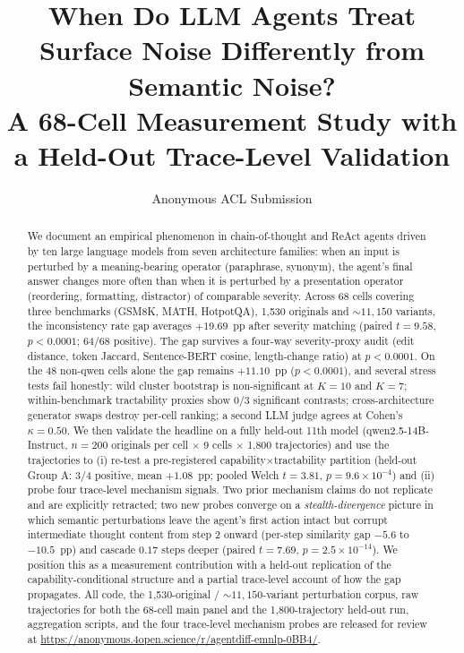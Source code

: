 \documentclass[11pt]{article}
\title{When Do LLM Agents Treat Surface Noise Differently from Semantic Noise?\\
A 68-Cell Measurement Study with a Held-Out Trace-Level Validation}
\author{Anonymous ACL Submission}
\begin{document}
\maketitle

\begin{abstract}
We document an empirical phenomenon in chain-of-thought and ReAct agents driven by ten large language models from seven architecture families: when an input is perturbed by a meaning-bearing operator (paraphrase, synonym), the agent's final answer changes more often than when it is perturbed by a presentation operator (reordering, formatting, distractor) of comparable severity. Across 68 cells covering three benchmarks (GSM8K, MATH, HotpotQA), 1{,}530 originals and ${\sim}11{,}150$ variants, the inconsistency rate gap averages $+19.69$~pp after severity matching (paired $t=9.58$, $p<0.0001$; 64/68 positive). The gap survives a four-way severity-proxy audit (edit distance, token Jaccard, Sentence-BERT cosine, length-change ratio) at $p<0.0001$. On the 48 non-qwen cells alone the gap remains $+11.10$~pp ($p<0.0001$), and several stress tests fail honestly: wild cluster bootstrap is non-significant at $K{=}10$ and $K{=}7$; within-benchmark tractability proxies show $0/3$ significant contrasts; cross-architecture generator swaps destroy per-cell ranking; a second LLM judge agrees at Cohen's $\kappa=0.50$. We then validate the headline on a fully held-out 11th model (qwen2.5-14B-Instruct, $n=200$ originals per cell $\times$ 9 cells $\times$ 1{,}800 trajectories) and use the trajectories to (i) re-test a pre-registered capability$\times$tractability partition (held-out Group A: 3/4 positive, mean $+1.08$~pp; pooled Welch $t=3.81$, $p=9.6\!\times\!10^{-4}$) and (ii) probe four trace-level mechanism signals. Two prior mechanism claims do not replicate and are explicitly retracted; two new probes converge on a \emph{stealth-divergence} picture in which semantic perturbations leave the agent's first action intact but corrupt intermediate thought content from step 2 onward (per-step similarity gap $-5.6$ to $-10.5$~pp) and cascade $0.17$ steps deeper (paired $t=7.69$, $p=2.5\!\times\!10^{-14}$). We position this as a measurement contribution with a held-out replication of the capability-conditional structure and a partial trace-level account of how the gap propagates. All code, the 1{,}530-original / ${\sim}11{,}150$-variant perturbation corpus, raw trajectories for both the 68-cell main panel and the 1{,}800-trajectory held-out run, aggregation scripts, and the four trace-level mechanism probes are released for review at \url{https://anonymous.4open.science/r/agentdiff-emnlp-0BB4/}.
\end{abstract}
\end{document}
